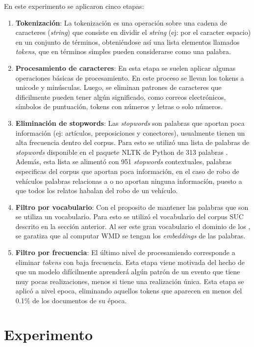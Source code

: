 \documentclass[letterpaper,12pt,oneside]{book} %
\begin{document}
En este experimento se aplicaron cinco etapas:
\begin{enumerate}
\item \textbf{Tokenización}: La tokenización es una operación sobre una cadena de caracteres (\textit{string}) que consiste en dividir el \textit{string} (ej: por el caracter espacio) en un conjunto de términos, obteniéndose así una lista elementos llamados \textit{tokens}, que en términos simples pueden considerarse como una palabra.
\item \textbf{Procesamiento de caracteres}: En esta etapa se suelen aplicar algunas operaciones básicas de procesamiento. En este proceso se llevan los tokens a unicode y minúsculas. Luego, se eliminan patrones de caracteres que dificilmente pueden tener algún significado, como correos electrónicos, símbolos de puntuación, tokens con números y letras o solo números. 
\item \textbf{Eliminación de stopwords}: Las \textit{stopwords} son palabras que aportan poca información (ej: artículos, preposiciones y conectores), usualmente tienen un alta frecuencia dentro del corpus. Para esto se utilizó una lista de palabras de \textit{stopwords} disponible en el paquete NLTK de Python de 313 palabras \citep{bird2009natural}. Además, esta lista se alimentó con 951 \textit{stopwords} contextuales, palabras especificas del corpus que aportan poca información, en el caso de robo de vehículos palabras relacionas a  o  no aportan ninguna información, puesto a que todos los relatos habalan del robo de un vehículo. 
\item \textbf{Filtro por vocabulario}: Con el proposito de mantener las palabras que son  se utiliza un vocabulario. Para esto se utilizó el vocabulario del corpus SUC descrito en la sección anterior. Al ser este gran vocabulario el dominio de los , se garatiza que al computar WMD se tengan los \textit{embeddings} de las palabras.
\item \textbf{Filtro por frecuencia}: El último nivel de procesamiendo corresponde a eliminar \textit{tokens} con baja frecuencia. Esta etapa viene motivada del hecho de que un modelo difícilmente aprenderá algún patrón de un evento que tiene muy pocas realizaciones, menos si tiene una realización única. Esta etapa se aplicó a nivel epoca, eliminando aquellos tokens que aparecen en menos del 0.1\% de los documentos de su época.
\end{enumerate}


\chapter{Experimento}
\end{document}
